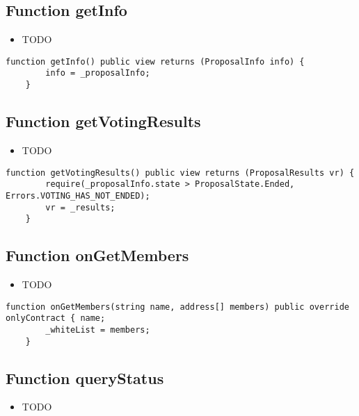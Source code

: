 \subsection{Function getInfo}

\begin{itemize}
\item TODO
\end{itemize}

\begin{lstlisting}[firstnumber=208]
    function getInfo() public view returns (ProposalInfo info) {
        info = _proposalInfo;
    }
\end{lstlisting}

\subsection{Function getVotingResults}

\begin{itemize}
\item TODO
\end{itemize}

\begin{lstlisting}[firstnumber=203]
    function getVotingResults() public view returns (ProposalResults vr) {
        require(_proposalInfo.state > ProposalState.Ended, Errors.VOTING_HAS_NOT_ENDED);
        vr = _results;
    }
\end{lstlisting}

\subsection{Function onGetMembers}

\begin{itemize}
\item TODO
\end{itemize}

\begin{lstlisting}[firstnumber=220]
    function onGetMembers(string name, address[] members) public override onlyContract { name;
        _whiteList = members;
    }
\end{lstlisting}

\subsection{Function queryStatus}

\begin{itemize}
\item TODO
\end{itemize}

